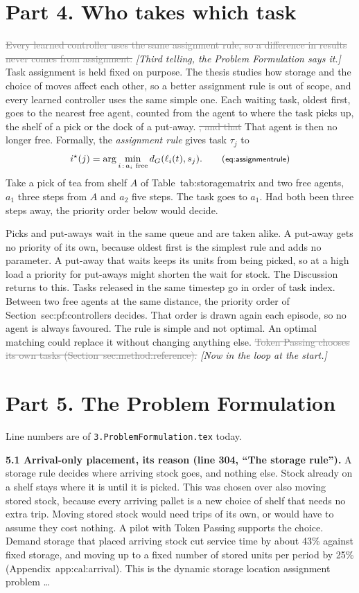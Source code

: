 \documentclass[11pt,a4paper]{article}
\newcommand{\new}[1]{\textcolor{newc}{#1}}
\newcommand{\old}[1]{\textcolor{gray}{\sout{#1}}}
\newcommand{\note}[1]{{\small\itshape [#1]}}
\newcommand{\lab}[1]{\textsf{\footnotesize #1}}
\renewcommand{\ref}[1]{\lab{#1}}
\begin{document}
\section*{Part 4. Who takes which task}
\old{Every learned controller uses the same assignment rule, so a difference
in results never comes from assignment.} \note{Third telling, the Problem
Formulation says it.}
\new{Task assignment is held fixed on purpose. The thesis studies how
storage and the choice of moves affect each other, so a better assignment
rule is out of scope, and every learned controller uses the same simple
one.} Each waiting task, oldest first, goes to the nearest free agent\new{,
counted from the agent to where the task picks up, the shelf of a pick or
the dock of a put-away}. \old{, and that} \new{That} agent is then no
longer free. Formally, the \emph{assignment rule} gives task $\tau_j$ to
\begin{equation*}
  i^\star(j) = \arg\min_{i \,:\, a_i \text{ free}} d_G(\ell_i(t), s_j) .
  \tag{\lab{eq:assignmentrule}}
\end{equation*}
\new{Take a pick of tea from shelf $A$ of Table~\ref{tab:storagematrix} and
two free agents, $a_1$ three steps from $A$ and $a_2$ five steps. The task
goes to $a_1$. Had both been three steps away, the priority order below
would decide.}

Picks and put-aways wait in the same queue and are taken alike. A put-away
gets no priority of its own, because oldest first is the simplest rule and
adds no parameter. \new{A put-away that waits keeps its units from being
picked, so at a high load a priority for put-aways might shorten the wait
for stock. The Discussion returns to this.} Tasks released in the same
timestep go in order of task index. Between two free agents at the same
distance, the priority order of Section~\ref{sec:pf:controllers} decides.
That order is drawn again each episode, so no agent is always favoured. The
rule is simple and not optimal. An optimal matching could replace it without
changing anything else. \old{Token Passing chooses its own tasks
(Section~\ref{sec:method:reference}).} \note{Now in the loop at the start.}

\section*{Part 5. The Problem Formulation}
Line numbers are of \texttt{3.ProblemFormulation.tex} today.

\textbf{5.1 Arrival-only placement, its reason (line 304, ``The storage
rule'').} A storage rule decides where arriving stock goes, and nothing
else. Stock already on a shelf stays where it is until it is picked.
\new{This was chosen over also moving stored stock, because every arriving
pallet is a new choice of shelf that needs no extra trip. Moving stored
stock would need trips of its own, or would have to assume they cost
nothing. A pilot with Token Passing supports the choice. Demand storage
that placed arriving stock cut service time by about 43\% against fixed
storage, and moving up to a fixed number of stored units per period by
25\% (Appendix~\ref{app:cal:arrival}).} This is the dynamic storage
location assignment problem \dots
\end{document}
